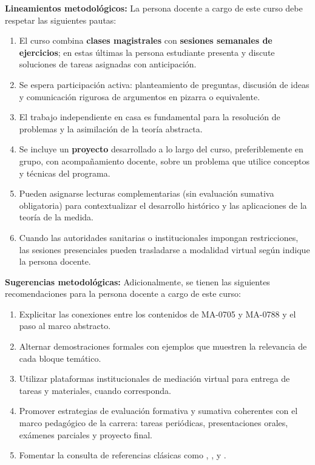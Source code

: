 \begin{refsection}
\noindent \textbf{Lineamientos metodológicos:} La persona docente a cargo de este curso debe respetar las siguientes pautas:

\begin{enumerate}
    \item El curso combina \textbf{clases magistrales} con \textbf{sesiones semanales de ejercicios}; en estas últimas la persona estudiante presenta y discute soluciones de tareas asignadas con anticipación.
    \item Se espera participación activa: planteamiento de preguntas, discusión de ideas y comunicación rigurosa de argumentos en pizarra o equivalente.
    \item El trabajo independiente en casa es fundamental para la resolución de problemas y la asimilación de la teoría abstracta.
    \item Se incluye un \textbf{proyecto} desarrollado a lo largo del curso, preferiblemente en grupo, con acompañamiento docente, sobre un problema que utilice conceptos y técnicas del programa.
    \item Pueden asignarse lecturas complementarias (sin evaluación sumativa obligatoria) para contextualizar el desarrollo histórico y las aplicaciones de la teoría de la medida.
    \item Cuando las autoridades sanitarias o institucionales impongan restricciones, las sesiones presenciales pueden trasladarse a modalidad virtual según indique la persona docente.
\end{enumerate}

\textbf{Sugerencias metodológicas:} Adicionalmente, se tienen las siguientes recomendaciones para la persona docente a cargo de este curso:

\begin{enumerate}
    \item Explicitar las conexiones entre los contenidos de MA-0705 y MA-0788 y el paso al marco abstracto.
    \item Alternar demostraciones formales con ejemplos que muestren la relevancia de cada bloque temático.
    \item Utilizar plataformas institucionales de mediación virtual para entrega de tareas y materiales, cuando corresponda.
    \item Promover estrategias de evaluación formativa y sumativa coherentes con el marco pedagógico de la carrera: tareas periódicas, presentaciones orales, exámenes parciales y proyecto final.
    \item Fomentar la consulta de referencias clásicas como \cite{Fol99}, \cite{SS05}, \cite{Lie01} y \cite{Vil03}.
\end{enumerate}

\nocite{Bog20}
\nocite{BBT08}
\nocite{Fol99}
\nocite{Lie01}
\nocite{RF10}
\nocite{SS05}
\nocite{Vil03}

\printcursosbibliography
\end{refsection}
